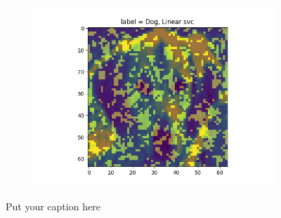 \documentclass{article}
\begin{document}
\begin{figure}[H]
\begin{subfigure}{.33\textwidth}
  \label{fig:sub-second}
\end{subfigure}
\begin{subfigure}{.33\textwidth}
  \centering
  \includegraphics[width=1\linewidth]{2c/Imp feat SVM.png}  
  
  \label{fig:sub-second}
\end{subfigure}
\caption{Put your caption here}
\label{feet pics}
\end{figure}
\end{document}
